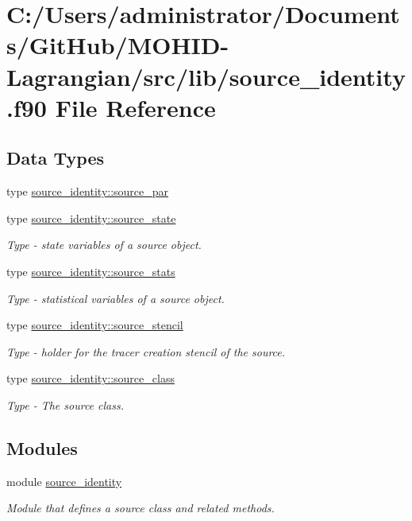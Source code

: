 \hypertarget{source__identity_8f90}{}\section{C\+:/\+Users/administrator/\+Documents/\+Git\+Hub/\+M\+O\+H\+I\+D-\/\+Lagrangian/src/lib/source\+\_\+identity.f90 File Reference}
\label{source__identity_8f90}
\subsection*{Data Types}
\begin{DoxyCompactItemize}
\item 
type \hyperlink{structsource__identity_1_1source__par}{source\+\_\+identity\+::source\+\_\+par}
\item 
type \hyperlink{structsource__identity_1_1source__state}{source\+\_\+identity\+::source\+\_\+state}
\begin{DoxyCompactList}\small\item\em Type -\/ state variables of a source object. \end{DoxyCompactList}\item 
type \hyperlink{structsource__identity_1_1source__stats}{source\+\_\+identity\+::source\+\_\+stats}
\begin{DoxyCompactList}\small\item\em Type -\/ statistical variables of a source object. \end{DoxyCompactList}\item 
type \hyperlink{structsource__identity_1_1source__stencil}{source\+\_\+identity\+::source\+\_\+stencil}
\begin{DoxyCompactList}\small\item\em Type -\/ holder for the tracer creation stencil of the source. \end{DoxyCompactList}\item 
type \hyperlink{structsource__identity_1_1source__class}{source\+\_\+identity\+::source\+\_\+class}
\begin{DoxyCompactList}\small\item\em Type -\/ The source class. \end{DoxyCompactList}\end{DoxyCompactItemize}
\subsection*{Modules}
\begin{DoxyCompactItemize}
\item 
module \hyperlink{namespacesource__identity}{source\+\_\+identity}
\begin{DoxyCompactList}\small\item\em Module that defines a source class and related methods. \end{DoxyCompactList}\end{DoxyCompactItemize}
